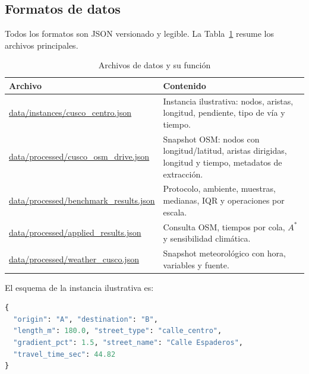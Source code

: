 \subsection{Formatos de datos}
Todos los formatos son JSON versionado y legible. La Tabla~\ref{tab:formatos} resume los archivos principales.

\begin{table}[H]
    \centering
    \fontsize{9}{11}\selectfont
    \caption{Archivos de datos y su función}
    \label{tab:formatos}
    \begin{tabularx}{\textwidth}{@{}>{\ttfamily\raggedright\arraybackslash}p{5.1cm} >{\raggedright\arraybackslash}X@{}}
        \toprule
        \textbf{Archivo} & \textbf{Contenido} \\
        \midrule
        \url{data/instances/cusco_centro.json} & Instancia ilustrativa: nodos, aristas, longitud, pendiente, tipo de vía y tiempo. \\
        \url{data/processed/cusco_osm_drive.json} & Snapshot OSM: nodos con longitud/latitud, aristas dirigidas, longitud y tiempo, metadatos de extracción. \\
        \url{data/processed/benchmark_results.json} & Protocolo, ambiente, muestras, medianas, IQR y operaciones por escala. \\
        \url{data/processed/applied_results.json} & Consulta OSM, tiempos por cola, $A^*$ y sensibilidad climática. \\
        \url{data/processed/weather_cusco.json} & Snapshot meteorológico con hora, variables y fuente. \\
        \bottomrule
    \end{tabularx}
\end{table}

El esquema de la instancia ilustrativa es:
\begin{lstlisting}[language=Python, caption={Extracto del JSON de una arista}]
{
  "origin": "A", "destination": "B",
  "length_m": 180.0, "street_type": "calle_centro",
  "gradient_pct": 1.5, "street_name": "Calle Espaderos",
  "travel_time_sec": 44.82
}
\end{lstlisting}

